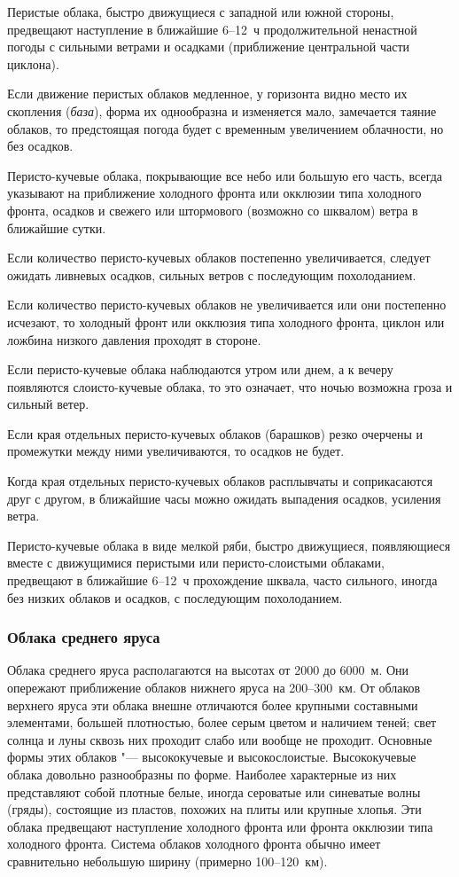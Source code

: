  Перистые облака, быстро движущиеся с западной или южной
стороны, предвещают наступление в ближайшие 6--12~ч продолжительной
ненастной погоды с сильными ветрами и осадками (приближение
центральной части циклона).

 Если движение перистых облаков медленное, у горизонта видно
место их скопления (\textit{база}), форма их однообразна и изменяется мало,
замечается таяние облаков, то предстоящая погода будет с временным
увеличением облачности, но без осадков.

 Перисто-кучевые облака, покрывающие все небо или большую его
часть, всегда указывают на приближение холодного фронта или окклюзии
типа холодного фронта, осадков и свежего или штормового (возможно со
шквалом) ветра в ближайшие сутки.

 Если количество перисто-кучевых облаков постепенно
увеличивается, следует ожидать ливневых осадков, сильных ветров с
последующим похолоданием.

 Если количество перисто-кучевых облаков не увеличивается или
они постепенно исчезают, то холодный фронт или окклюзия типа холодного
фронта, циклон или ложбина низкого давления проходят в стороне.

 Если перисто-кучевые облака наблюдаются утром или днем, а к вечеру
появляются слоисто-кучевые облака, то это означает, что ночью возможна
гроза и сильный ветер.

 Если края отдельных перисто-кучевых облаков (барашков) резко
очерчены и промежутки между ними увеличиваются, то осадков не будет.

 Когда края отдельных перисто-кучевых облаков расплывчаты и
соприкасаются друг с другом, в ближайшие часы можно ожидать выпадения
осадков, усиления ветра.

 Перисто-кучевые облака в виде мелкой ряби, быстро движущиеся,
появляющиеся вместе с движущимися перистыми или перисто-слоистыми
облаками, предвещают в ближайшие 6--12~ч прохождение шквала, часто
сильного, иногда без низких облаков и осадков, с последующим
похолоданием.

\subsubsection{Облака среднего яруса}

Облака среднего яруса располагаются на высотах от 2000 до 6000~м. Они
опережают приближение облаков нижнего яруса на 200--300~км. От облаков
верхнего яруса эти облака внешне отличаются более крупными составными
элементами, большей плотностью, более серым цветом и наличием теней;
свет солнца и луны сквозь них проходит слабо или вообще не
проходит. Основные формы этих облаков "--- высококучевые и
высокослоистые. Высококучевые облака довольно разнообразны по
форме. Наиболее характерные из них представляют собой плотные белые,
иногда сероватые или синеватые волны (гряды), состоящие из пластов,
похожих на плиты или крупные хлопья. Эти облака предвещают наступление
холодного фронта или фронта окклюзии типа холодного фронта. Система
облаков холодного фронта обычно имеет сравнительно небольшую ширину
(примерно 100--120~км).

